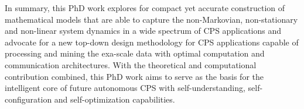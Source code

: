 In summary, this PhD work explores for compact yet accurate construction of mathematical models that are able to capture the non-Markovian, non-stationary and non-linear system dynamics in a wide spectrum of CPS applications and advocate for a new top-down design methodology for CPS applications capable of processing and mining the exa-scale data with optimal computation and communication architectures. With the theoretical and computational contribution combined, this PhD work aims to serve as the basis for the intelligent core of future autonomous CPS with self-understanding, self-configuration and self-optimization capabilities.

